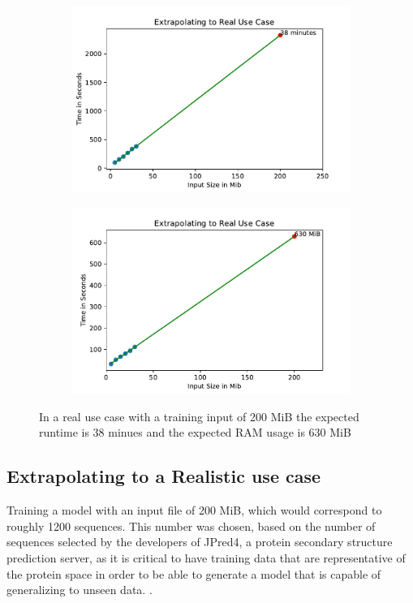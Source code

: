 \documentclass{article}
\begin{document}
\begin{figure}[h]

\begin{subfigure}{0.5\textwidth}
\includegraphics[width=0.9\linewidth]{img/stats/extrapolating_time_label.pdf} %
\label{fig:subextra1}
\end{subfigure}
\begin{subfigure}{0.5\textwidth}
\includegraphics[width=0.9\linewidth]{img/stats/extrapolating_ram.pdf} %
\label{fig:subextra2}
\end{subfigure}

\caption{In a real use case with a training input of 200 MiB the expected runtime is 38 minues and the expected RAM usage is 630 MiB}
\label{fig:image3}
\end{figure}
\FloatBarrier

\subsection{Extrapolating to a Realistic use case}
Training a model with an input file of 200 MiB, which would correspond to roughly 1200 sequences.
This number was chosen, based on the number of sequences selected by the developers of JPred4, a protein secondary structure prediction server, as it is critical to have training data that are representative of the protein space in order to be able to generate a model that is capable of generalizing to unseen data.  \cite{drozdetskiy_jpred4_2015-1}.
\end{document}
